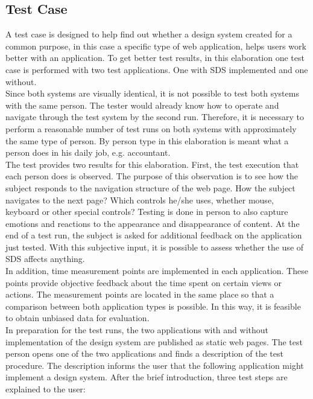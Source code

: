 \subsection{Test Case}\label{text_case}
A test case is designed to help find out whether a design system created for a common purpose, in this case a specific type of web application, helps users work better with an application. To get better test results, in this elaboration one test case is performed with two test applications. One with SDS implemented and one without. \\
Since both systems are visually identical, it is not possible to test both systems with the same person. The tester would already know how to operate and navigate through the test system by the second run. Therefore, it is necessary to perform a reasonable number of test runs on both systems with approximately the same type of person. By person type in this elaboration is meant what a person does in his daily job, e.g. accountant.  \\
The test provides two results for this elaboration. First, the test execution that each person does is observed. The purpose of this observation is to see how the subject responds to the navigation structure of the web page. How the subject navigates to the next page? Which controls he/she uses, whether mouse, keyboard or other special controls? Testing is done in person to also capture emotions and reactions to the appearance and disappearance of content. At the end of a test run, the subject is asked for additional feedback on the application just tested. With this subjective input, it is possible to assess whether the use of \ac{SDS} affects anything. \\
In addition, time measurement points are implemented in each application. These points provide objective feedback about the time spent on certain views or actions. The measurement points are located in the same place so that a comparison between both application types is possible.  In this way, it is feasible to obtain unbiased data for evaluation. \\
In preparation for the test runs, the two applications with and without implementation of the design system are published as static web pages. The test person opens one of the two applications and finds a description of the test procedure. The description informs the user that the following application might implement a design system. After the brief introduction, three test steps are explained to the user:

